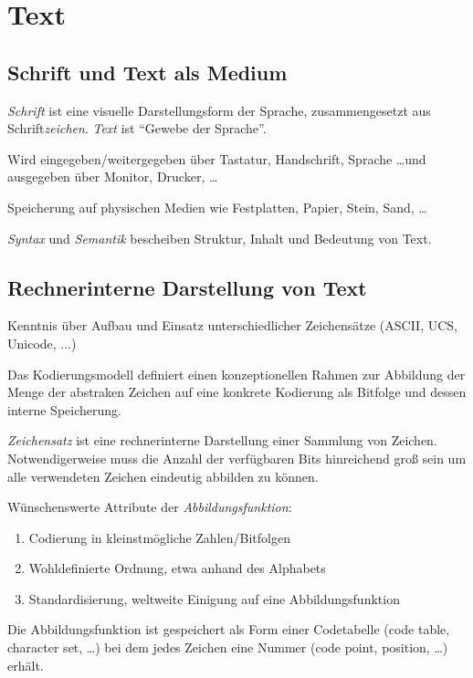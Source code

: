 \documentclass[twocolumn]{article}
\begin{document}
\section{Text}

\subsection{Schrift und Text als Medium}

\emph{Schrift} ist eine visuelle Darstellungsform der Sprache, zusammengesetzt aus Schrift\emph{zeichen}. \emph{Text} ist \enquote{Gewebe der Sprache}.

Wird eingegeben/weitergegeben über Tastatur, Handschrift, Sprache \ldots und ausgegeben über Monitor, Drucker, \ldots

Speicherung auf physischen Medien wie Festplatten, Papier, Stein, Sand, \ldots

\emph{Syntax} und \emph{Semantik} bescheiben Struktur, Inhalt und Bedeutung von Text.

\subsection{Rechnerinterne Darstellung von Text}

Kenntnis über Aufbau und Einsatz unterschiedlicher Zeichensätze (ASCII, UCS, Unicode, ...)

Das Kodierungsmodell definiert einen konzeptionellen Rahmen zur Abbildung der Menge der abstraken Zeichen auf eine konkrete Kodierung als Bitfolge und dessen interne Speicherung.

\emph{Zeichensatz} ist eine rechnerinterne Darstellung einer Sammlung von Zeichen. Notwendigerweise muss die Anzahl der verfügbaren Bits hinreichend groß sein um alle verwendeten Zeichen eindeutig abbilden zu können.

Wünschenswerte Attribute der \emph{Abbildungsfunktion}:
\begin{enumerate}
    \item Codierung in kleinstmögliche Zahlen/Bitfolgen
    \item Wohldefinierte Ordnung, etwa anhand des Alphabets
    \item Standardisierung, weltweite Einigung auf eine Abbildungsfunktion
\end{enumerate}

Die Abbildungsfunktion ist gespeichert als Form einer Codetabelle (code table, character set, \ldots) bei dem jedes Zeichen eine Nummer (code point, position, \ldots) erhält.
\end{document}
